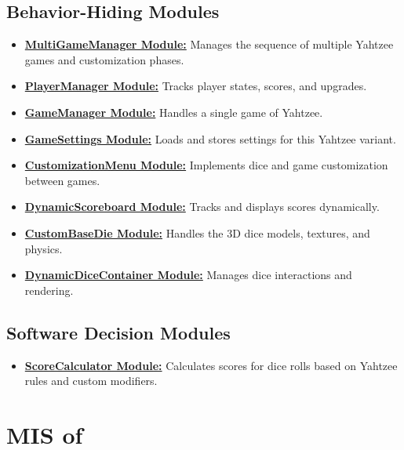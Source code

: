 \documentclass[12pt, titlepage]{article}
\begin{document}
\subsection{Behavior-Hiding Modules}
\begin{itemize}
    \item \hyperref[MultiGameManager]{\textbf{MultiGameManager Module:}} Manages the sequence of multiple Yahtzee games and customization phases.
    \item \hyperref[PlayerManager]{\textbf{PlayerManager Module:}} Tracks player states, scores, and upgrades.
    \item \hyperref[GameManager]{\textbf{GameManager Module:}} Handles a single game of Yahtzee.
    \item \hyperref[GameSettings]{\textbf{GameSettings Module:}} Loads and stores settings for this Yahtzee variant.
    \item \hyperref[CustomizationMenu]{\textbf{CustomizationMenu Module:}} Implements dice and game customization between games.
    \item \hyperref[DynamicScoreboard]{\textbf{DynamicScoreboard Module:}} Tracks and displays scores dynamically.
    \item \hyperref[CustomBaseDie]{\textbf{CustomBaseDie Module:}} Handles the 3D dice models, textures, and physics.
    \item \hyperref[DynamicDiceContainer]{\textbf{DynamicDiceContainer Module:}} Manages dice interactions and rendering.
\end{itemize}

\subsection{Software Decision Modules}
\begin{itemize}
    \item \hyperref[ScoreCalculator]{\textbf{ScoreCalculator Module:}} Calculates scores for dice rolls based on Yahtzee rules and custom modifiers.
\end{itemize}

\newpage

\iffalse
\section{MIS of } \label{Module} 

\end{document}
